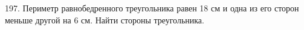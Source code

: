 197. Периметр равнобедренного треугольника равен 18 см и одна из его сторон меньше другой на 6 см. Найти стороны треугольника.\\
